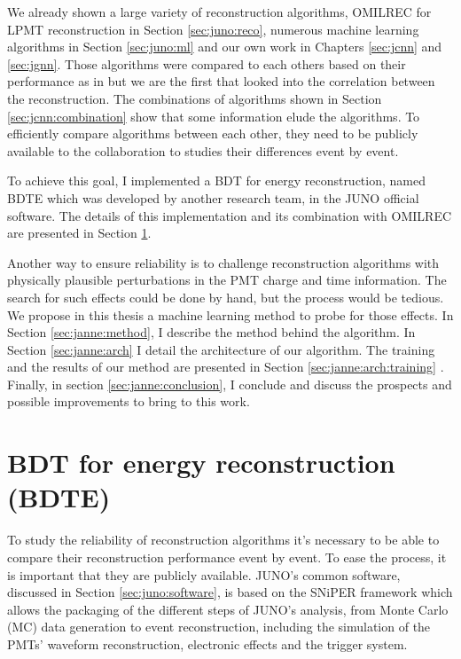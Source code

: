 \documentclass[../main.tex]{subfiles}
\begin{document}
We already shown a large variety of reconstruction algorithms, OMILREC for LPMT reconstruction in Section \ref{sec:juno:reco}, numerous machine learning algorithms in Section \ref{sec:juno:ml} and our own work in Chapters \ref{sec:jcnn} and \ref{sec:jgnn}. Those algorithms were compared to each others based on their performance as in \cite{qian_vertex_2021} but we are the first that looked into the correlation between the reconstruction. The combinations of algorithms shown in Section \ref{sec:jcnn:combination} show that some information elude the algorithms. To efficiently compare algorithms between each other, they need to be publicly available to the collaboration to studies their differences event by event.

To achieve this goal, I implemented a BDT for energy reconstruction, named BDTE which was developed by another research team, in the JUNO official software. The details of this implementation and its combination with OMILREC are presented in Section \ref{sec:janne:BDTE}.

Another way to ensure reliability is to challenge reconstruction algorithms with physically plausible perturbations in the PMT charge and time information.
The search for such effects could be done by hand, but the process would be tedious. We propose in this thesis a machine learning method to probe for those effects.  In Section \ref{sec:janne:method}, I describe the method behind the algorithm. In Section \ref{sec:janne:arch} I detail the architecture of our algorithm.
The training and the results of our method are presented in Section \ref{sec:janne:arch:training} . Finally, in section \ref{sec:janne:conclusion}, I conclude and discuss the prospects and possible improvements to bring to this work.


\section{BDT for energy reconstruction (BDTE)}
\label{sec:janne:BDTE}

To study the reliability of reconstruction algorithms it's necessary to be able to compare their reconstruction performance event by event. To ease the process, it is important that they are publicly available. JUNO's common software, discussed in Section \ref{sec:juno:software}, is based on the SNiPER framework \cite{lin_application_2017} which allows the packaging of the different steps of JUNO's analysis, from Monte Carlo (MC) data generation to event reconstruction, including the simulation of the PMTs' waveform reconstruction, electronic effects and the trigger system.
\end{document}

